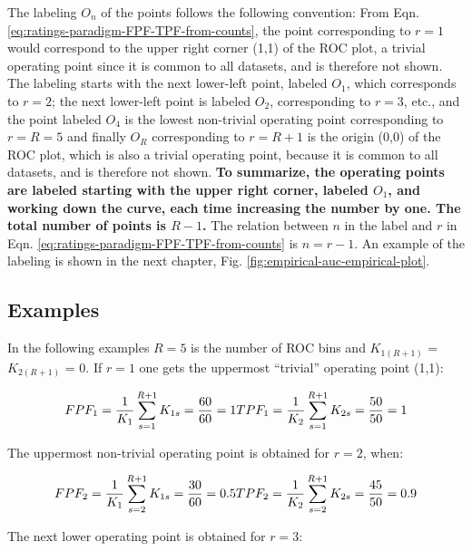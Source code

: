 \documentclass[
]{book}
\begin{document}
The labeling \(O_n\) of the points follows the following convention: From Eqn. \eqref{eq:ratings-paradigm-FPF-TPF-from-counts}, the point corresponding to \(r=1\) would correspond to the upper right corner (1,1) of the ROC plot, a trivial operating point since it is common to all datasets, and is therefore not shown. The labeling starts with the next lower-left point, labeled \(O_1\), which corresponds to \(r=2\); the next lower-left point is labeled \(O_2\), corresponding to \(r=3\), etc., and the point labeled \(O_4\) is the lowest non-trivial operating point corresponding to \(r=R=5\) and finally \(O_R\) corresponding to \(r=R+1\) is the origin (0,0) of the ROC plot, which is also a trivial operating point, because it is common to all datasets, and is therefore not shown. \textbf{To summarize, the operating points are labeled starting with the upper right corner, labeled \(O_1\), and working down the curve, each time increasing the number by one. The total number of points is \(R-1\).} The relation between \(n\) in the label and \(r\) in Eqn. \eqref{eq:ratings-paradigm-FPF-TPF-from-counts} is \(n=r-1\). An example of the labeling is shown in the next chapter, Fig. \ref{fig:empirical-auc-empirical-plot}.

\hypertarget{ratings-task-examples}{%
\subsection{Examples}\label{ratings-task-examples}}

In the following examples \(R = 5\) is the number of ROC bins and \(K_{1(R+1)}\) = \(K_{2(R+1)}\) = 0. If \(r = 1\) one gets the uppermost ``trivial'' operating point (1,1):

\begin{equation*} 
FPF_1=\frac {1} {K_1} \sum_{s=1}^{R+1}K_{1s} = \frac{60}{60} = 1\\
TPF_1=\frac {1} {K_2} \sum_{s=1}^{R+1}K_{2s} = \frac{50}{50} = 1
\end{equation*}

The uppermost non-trivial operating point is obtained for \(r = 2\), when:

\begin{equation*} 
FPF_2=\frac {1} {K_1} \sum_{s=2}^{R+1}K_{1s} = \frac{30}{60} = 0.5\\
TPF_2=\frac {1} {K_2} \sum_{s=2}^{R+1}K_{2s} = \frac{45}{50} = 0.9
\end{equation*}

The next lower operating point is obtained for \(r = 3\):
\end{document}
